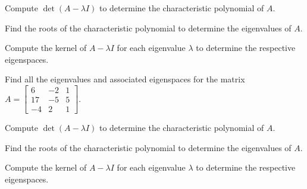 \begin{applicationActivities}{3}{27}
\begin{activity}{15}
\begin{subactivity}
 Compute $\det (A-\lambda I)$ to determine the characteristic polynomial of $A$.
\end{subactivity}
\begin{subactivity}
Find the roots of the characteristic polynomial to determine the eigenvalues of $A$.
\end{subactivity}
\begin{subactivity}
Compute the kernel of $A-\lambda I$ for each eigenvalue $\lambda$ to determine the respective eigenspaces.
\end{subactivity}
\end{activity}

\begin{activity}{15}
  Find all the eigenvalues and associated eigenspaces for the matrix $A=\begin{bmatrix} 6 & -2 & 1 \\ 17 & -5 & 5 \\ -4 & 2 & 1 \end{bmatrix}$.

\begin{subactivity}
 Compute $\det (A-\lambda I)$ to determine the characteristic polynomial of $A$.
\end{subactivity}
\begin{subactivity}
Find the roots of the characteristic polynomial to determine the eigenvalues of $A$.
\end{subactivity}
\begin{subactivity}
Compute the kernel of $A-\lambda I$ for each eigenvalue $\lambda$ to determine the respective eigenspaces.
\end{subactivity}
\end{activity}

\end{applicationActivities}
